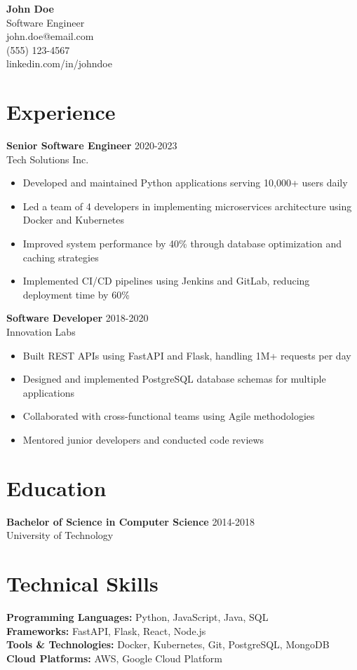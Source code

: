 \documentclass[11pt,letterpaper]{article}
\begin{document}
\noindent
\textbf{\Large John Doe} \\
Software Engineer \\
john.doe@email.com \\
(555) 123-4567 \\
linkedin.com/in/johndoe

\section*{Experience}

\textbf{Senior Software Engineer} \hfill 2020-2023 \\
Tech Solutions Inc. \\
\begin{itemize}[leftmargin=*]
\item Developed and maintained Python applications serving 10,000+ users daily
\item Led a team of 4 developers in implementing microservices architecture using Docker and Kubernetes
\item Improved system performance by 40\% through database optimization and caching strategies
\item Implemented CI/CD pipelines using Jenkins and GitLab, reducing deployment time by 60\%
\end{itemize}

\textbf{Software Developer} \hfill 2018-2020 \\
Innovation Labs \\
\begin{itemize}[leftmargin=*]
\item Built REST APIs using FastAPI and Flask, handling 1M+ requests per day
\item Designed and implemented PostgreSQL database schemas for multiple applications
\item Collaborated with cross-functional teams using Agile methodologies
\item Mentored junior developers and conducted code reviews
\end{itemize}

\section*{Education}

\textbf{Bachelor of Science in Computer Science} \hfill 2014-2018 \\
University of Technology

\section*{Technical Skills}

\textbf{Programming Languages:} Python, JavaScript, Java, SQL \\
\textbf{Frameworks:} FastAPI, Flask, React, Node.js \\
\textbf{Tools \& Technologies:} Docker, Kubernetes, Git, PostgreSQL, MongoDB \\
\textbf{Cloud Platforms:} AWS, Google Cloud Platform
\end{document}
